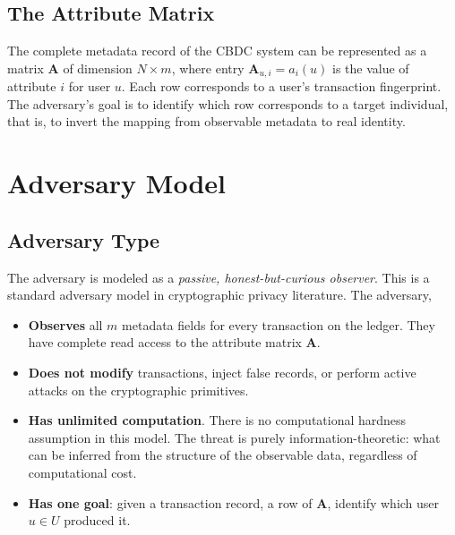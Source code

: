 \subsection{The Attribute Matrix}

The complete metadata record of the CBDC system can be
represented as a matrix $\mathbf{A}$ of dimension $N \times m$,
where entry $\mathbf{A}_{u,i} = a_i(u)$ is the value of
attribute $i$ for user $u$. Each row corresponds to a user's
transaction fingerprint. The adversary's goal is to identify
which row corresponds to a target individual, that is,
to invert the mapping from observable metadata to real
identity.

\section{Adversary Model}
\label{sec:adversary_model}

\subsection{Adversary Type}

The adversary is modeled as a \textit{passive,
honest-but-curious observer}. This is a standard adversary
model in cryptographic privacy literature. The adversary,

\begin{itemize}
    \item \textbf{Observes} all $m$ metadata fields for
    every transaction on the ledger. They have complete
    read access to the attribute matrix $\mathbf{A}$.

    \item \textbf{Does not modify} transactions, inject
    false records, or perform active attacks on the
    cryptographic primitives.

    \item \textbf{Has unlimited computation}. There is no
    computational hardness assumption in this model. The
    threat is purely information-theoretic: what can be
    inferred from the structure of the observable data,
    regardless of computational cost.

    \item \textbf{Has one goal}: given a transaction record,
a row of $\mathbf{A}$, identify which user
    $u \in U$ produced it.
\end{itemize}

